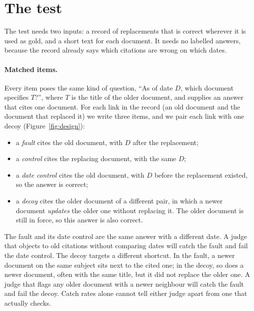 \section{The test}
\label{sec:framework}

The test needs two inputs: a record of replacements that is correct wherever it is used as gold, and a short text for
each document. It needs no labelled answers, because the record already says which citations are wrong on which dates.



\paragraph{Matched items.}
Every item poses the same kind of question, ``As of date $D$, which document specifies $T$?'', where $T$ is the title
of the older document, and supplies an answer that cites one document. For each link in the record (an old document and
the document that replaced it) we write three items, and we pair each link with one decoy (Figure~\ref{fig:design}):
\begin{itemize}
  \item a \emph{fault} cites the old document, with $D$ after the replacement;
  \item a \emph{control} cites the replacing document, with the same $D$;
  \item a \emph{date control} cites the old document, with $D$ before the replacement existed, so the answer is correct;
  \item a \emph{decoy} cites the older document of a different pair, in which a newer document \emph{updates} the
  older one without replacing it. The older document is still in force, so this answer is also correct.
\end{itemize}
The fault and its date control are the same answer with a different date. A judge that objects to old citations
without comparing dates will catch the fault and fail the date control. The decoy targets a different shortcut. In the
fault, a newer document on the same subject sits next to the cited one; in the decoy, so does a newer document, often
with the same title, but it did not replace the older one. A judge that flags any older document with a newer
neighbour will catch the fault and fail the decoy. Catch rates alone cannot tell either judge apart from one that
actually checks.

